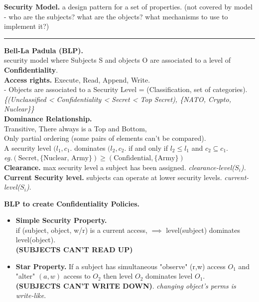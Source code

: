 \documentclass[9pt, a4paper]{extarticle}
\makeatletter
\let\oldwarning\warning
\renewcommand{\warning}{\raisebox{0.3ex}{\oldwarning}}
\renewcommand{\hline}{\noalign{\vskip 2px}\hrule\@height\arrayrulewidth\@width\linewidth\noalign{\vskip 2px}}
\makeatother
\begin{document}
\begin{minipage}[t]{0.495\textwidth}
	\textbf{Security Model.} a design pattern for a set of properties. (\warning not covered by model - who are the subjects? what are the objects? what mechanisms to use to implement it?)
	\hline
	\begin{minipage}[t]{0.5\textwidth}
		\textbf{Bell-La Padula (BLP).} \\security model where Subjects S and objects O are associated to a level of \textbf{Confidentiality}. \\
		\textbf{Access rights.} Execute, Read, Append, Write.\\
		- Objects are associated to a Security Level = (Classification, {set of categories}).\\
		\textit{\{(Unclassified < Confidentiality < Secret < Top Secret), \{NATO, Crypto, Nuclear\}\}}\\
		\textbf{Dominance Relationship.} \\
		Transitive, There always is a Top and Bottom, \\Only partial ordering (some pairs of elements can't be compared). \\
		A security level $(l_1, c_1.$ dominates $(l_2, c_2.$ if and only if $l_{2} \leq l_{1}$ and $c_{2} \subseteq c_{1}$.\\
		\textit{eg.$(\text{Secret}, \{ \text{Nuclear, Army} \}) \geq (\text{Confidential}, \{ \text{Army} \})$}\\
		\textbf{Clearance.} max security level a subject has been assigned. \textit{clearance-level($S_i$).}\\
		\textbf{Current Security level.} subjects can operate at lower security levels. \textit{current-level($S_{i}$)}.
	\end{minipage}
	\begin{minipage}[t]{0.5\textwidth}
		\textbf{BLP to create Confidentiality Policies.}
		\begin{itemize}[itemsep=2pt]
			\item[] \textbf{Simple Security Property.}\\
			      if (subject, object, w/r) is a current access, $\implies$ level(subject) dominates level(object). \\\textbf{(SUBJECTS CAN'T READ UP)}
			\item[] \textbf{Star Property.} If a subject has simultaneous "observe" (r,w) access $O_{1}$ and "alter" $(a, w)$  access to $O_2$ then level $O_2$ dominates level $O_1$.\\
			      \textbf{(SUBJECTS CAN'T WRITE DOWN)}. \textit{changing object's perms is write-like}.

\end{itemize}
\end{minipage}
\end{minipage}
\end{document}

